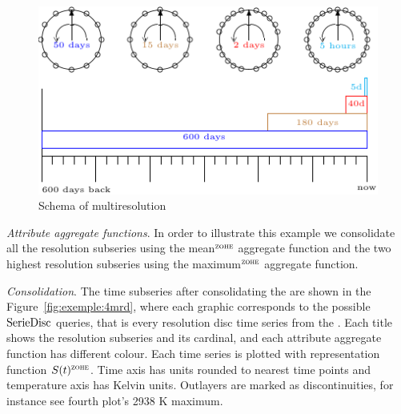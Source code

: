 \begin{figure}[tp]
  \centering
  \setlength{\unitlength}{1.3mm}
  \includegraphics{fig_exemple_window.pdf}
  \caption{Schema of multiresolution}
  \label{fig:exemple:window}
\end{figure}

\emph{Attribute aggregate functions}.  In order to illustrate this
example we consolidate all the resolution subseries using the
mean$^\zohe{}$ aggregate function and the two highest resolution
subseries using the maximum$^\zohe{}$ aggregate function. 



\emph{Consolidation}. The time subseries after consolidating the
 are shown in the Figure~\ref{fig:exemple:4mrd}, where
each graphic corresponds to the possible $\operatorname{SerieDisc}$ queries, that is
every resolution disc time series from the . Each title
shows the resolution subseries and its cardinal, and each attribute
aggregate function has different colour.  Each time series is plotted
with \zohe{} representation function $S(t)^\zohe{}$. Time axis has
 units rounded to nearest time points and temperature axis
has Kelvin units. Outlayers are marked as discontinuities, for
instance see fourth plot's 2938 K maximum.

